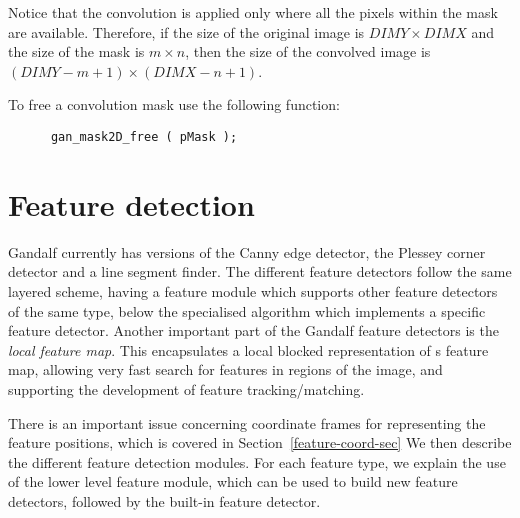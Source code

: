     Notice that the convolution is applied only where all the pixels within
    the mask are available. Therefore, if the size of the original image is
    $DIMY \times DIMX$ and the size of the mask is $m \times n$, then the
    size of the convolved image is $(DIMY - m + 1) \times (DIMX - n + 1)$.


    To free a convolution mask use the following function:

   \begin{verbatim}
      gan_mask2D_free ( pMask );
   \end{verbatim}



\section{Feature detection}
Gandalf currently has versions of the Canny edge detector, the Plessey
corner detector and a line segment finder. The different feature detectors
follow the same layered scheme, having a feature module which supports
other feature detectors of the same type, below the specialised algorithm
which implements a specific feature detector. Another important part of the
Gandalf feature detectors is the {\em local feature map}. This encapsulates
a local blocked representation of s feature map, allowing very fast search
for features in regions of the image, and supporting the development of
feature tracking/matching.

There is an important issue concerning coordinate frames for representing
the feature positions, which is covered in Section~\ref{feature-coord-sec}
We then describe the different feature detection
modules. For each feature type, we explain the use of the lower level
feature module, which can be used to build new feature detectors,
followed by the built-in feature detector.

